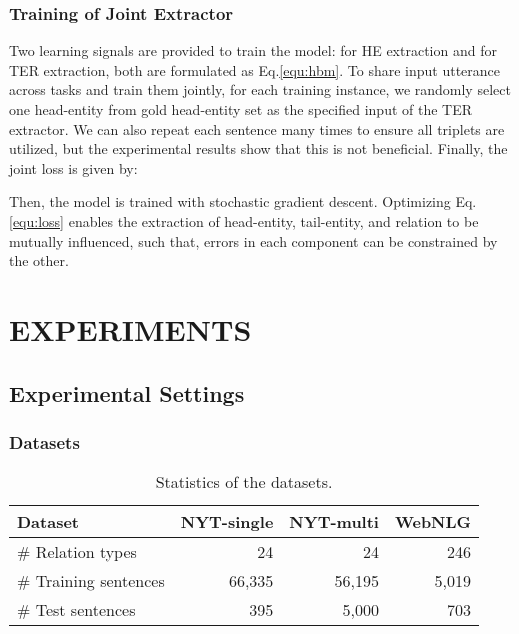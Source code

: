 \documentclass{ecai}
\begin{document}
\subsubsection{Training of Joint Extractor} 
Two learning signals are provided to train the model:  for HE extraction and  for TER extraction, both are formulated as Eq.\ref{equ:hbm}.
To share input utterance across tasks and train them jointly, for each training instance, we randomly select one head-entity from gold head-entity set as the specified input of the TER extractor. 
We can also repeat each sentence many times to ensure all triplets are utilized, but the experimental results show that this is not beneficial. 
Finally, the joint loss is given by: 
 


Then, the model is trained with stochastic gradient descent.
Optimizing Eq.\ref{equ:loss} enables the extraction of head-entity, tail-entity, and relation to be mutually influenced, such that, errors in each component can be constrained by the other. 


\section{EXPERIMENTS}

\subsection{Experimental Settings}

\subsubsection{Datasets}

\begin{table}
\begin{center}
{\caption{Statistics of the datasets.}
    \label{datasets}}
    \begin{tabular}{lrrr}\toprule
        Dataset & NYT-single & NYT-multi & WebNLG \\
    \midrule
        \# Relation types & 24 & 24 & 246 \\
\# Training sentences & 66,335 & 56,195 & 5,019 \\
        \# Test sentences & 395 & 5,000 & 703 \\


    \bottomrule
    \end{tabular}
\end{center}
\end{table}
\end{document}
